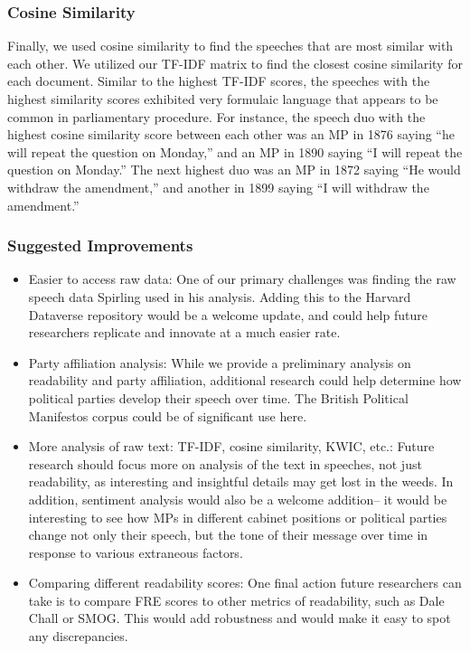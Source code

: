 \documentclass[
  letterpaper,
  DIV=11,
  numbers=noendperiod]{scrartcl}
\begin{document}
\subsubsection{Cosine Similarity}\label{cosine-similarity}

Finally, we used cosine similarity to find the speeches that are most
similar with each other. We utilized our TF-IDF matrix to find the
closest cosine similarity for each document. Similar to the highest
TF-IDF scores, the speeches with the highest similarity scores exhibited
very formulaic language that appears to be common in parliamentary
procedure. For instance, the speech duo with the highest cosine
similarity score between each other was an MP in 1876 saying ``he will
repeat the question on Monday,'' and an MP in 1890 saying ``I will
repeat the question on Monday.'' The next highest duo was an MP in 1872
saying ``He would withdraw the amendment,'' and another in 1899 saying
``I will withdraw the amendment.''

\subsubsection{Suggested Improvements}\label{suggested-improvements}

\begin{itemize}
\item
  Easier to access raw data: One of our primary challenges was finding
  the raw speech data Spirling used in his analysis. Adding this to the
  Harvard Dataverse repository would be a welcome update, and could help
  future researchers replicate and innovate at a much easier rate.
\item
  Party affiliation analysis: While we provide a preliminary analysis on
  readability and party affiliation, additional research could help
  determine how political parties develop their speech over time. The
  British Political Manifestos corpus could be of significant use here.
\item
  More analysis of raw text: TF-IDF, cosine similarity, KWIC, etc.:
  Future research should focus more on analysis of the text in speeches,
  not just readability, as interesting and insightful details may get
  lost in the weeds. In addition, sentiment analysis would also be a
  welcome addition-- it would be interesting to see how MPs in different
  cabinet positions or political parties change not only their speech,
  but the tone of their message over time in response to various
  extraneous factors.
\item
  Comparing different readability scores: One final action future
  researchers can take is to compare FRE scores to other metrics of
  readability, such as Dale Chall or SMOG. This would add robustness and
  would make it easy to spot any discrepancies.
\end{itemize}
\end{document}
